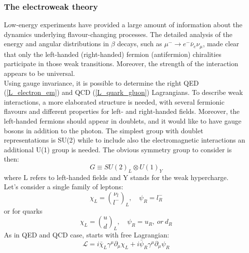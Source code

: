 \subsubsection{The electroweak theory}
Low-energy experiments have provided a large amount of information about the dynamics underlying flavour-changing processes. The detailed analysis of the energy and angular distributions in $\beta$ decays, such as $\mu^{-} \to e^{-}\bar{\nu}_{e}\nu_{\mu}$, made clear that only the left-handed (right-handed) fermion (antifermion) chiralities participate in those weak transitions. Moreover, the strength of the interaction appears to be universal. \\
Using gauge invariance, it is possible to determine the right QED (\ref{L_electron_em}) and QCD (\ref{L_quark_gluon}) Lagrangians. To describe weak interactions, a more elaborated structure is needed, with several fermionic flavours and different properties for left- and right-handed fields. Moreover, the left-handed fermions should appear in doublets, and it would like to have gauge bosons in addition to the photon. The simplest group with doublet representations is SU(2) while to include also the electromagnetic interactions an additional U(1) group is needed. The obvious symmetry group to consider is then:
\begin{equation}
G \equiv SU(2)_{L} \otimes U(1)_{Y}
\label{EWK_group}
\end{equation}
where L refers to left-handed fields and Y stands for the weak hypercharge. \\
Let's consider a single family of leptons:
\begin{equation}
\chi_{L} =  {\nu_{l} \choose l^{-}}_{L}, \quad \psi_{R} = l^{-}_{R}
\label{EWK_Singlet_doublet_Leptons}
\end{equation}
or for quarks
\begin{equation}
\chi_{L} =  {u \choose d}_{L} , \quad \psi_{R} = u_{R},\ or\ d_{R}
\label{EWK_Singlet_doublet_Leptons}
\end{equation}
As in QED and QCD case, starts with free Lagrangian:
\begin{equation}
\mathcal{L} = i\bar{\chi}_{L}\gamma^{\mu}\partial_{\mu}\chi_{L} + i\bar{\psi}_{R}\gamma^{\mu}\partial_{\mu}\psi_{R}
\label{L0_EWK}
\end{equation}

